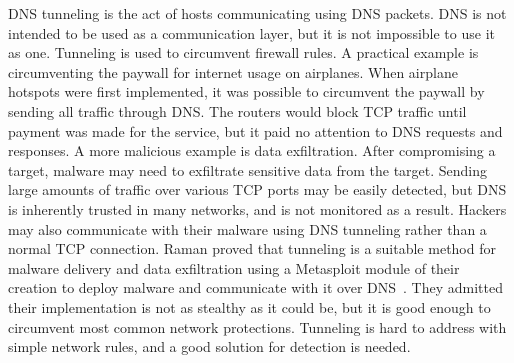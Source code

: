 DNS tunneling is the act of hosts communicating using DNS packets.
DNS is not intended to be used as a communication layer, but it is not impossible to use it as one.
Tunneling is used to circumvent firewall rules.
A practical example is circumventing the paywall for internet usage on airplanes.
When airplane hotspots were first implemented, it was possible to circumvent the paywall by sending
all traffic through DNS\@.
The routers would block TCP traffic until payment was made for the service, but it paid no attention
to DNS requests and responses.
A more malicious example is data exfiltration.
After compromising a target, malware may need to exfiltrate sensitive data from the target.
Sending large amounts of traffic over various TCP ports may be easily detected, but DNS is inherently
trusted in many networks, and is not monitored as a result.
Hackers may also communicate with their malware using DNS tunneling rather than a normal TCP
connection.
Raman \etal{} proved that tunneling is a suitable method for malware delivery and data exfiltration
using a Metasploit module of their creation to deploy malware and communicate with it over DNS~\cite{tunnelpenetrate}.
They admitted their implementation is not as stealthy as it could be, but it is good enough to
circumvent most common network protections.
Tunneling is hard to address with simple network rules, and a good solution for detection is needed.
